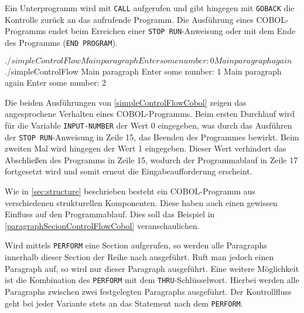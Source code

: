 Ein Unterprogramm wird mit \texttt{CALL} aufgerufen und gibt hingegen mit \texttt{GOBACK} die Kontrolle zurück an das aufrufende Programm. Die Ausführung eines COBOL-Programms endet beim Erreichen einer \texttt{STOP RUN}-Anweisung oder mit dem Ende des Programms (\texttt{END PROGRAM}). 

\sepCodeAndOutputCheck
\begin{shellwindow}
$ ./simpleControlFlow 
Main paragraph
Enter some number: 0
Main paragraph again
$ ./simpleControlFlow 
Main paragraph
Enter some number: 1 
Main paragraph again
Enter some number: 2
\end{shellwindow}

Die beiden Ausführungen von \autoref{simpleControlFlowCobol} zeigen das angesprochene Verhalten eines COBOL-Programms. Beim ersten Durchlauf wird für die Variable \texttt{INPUT-NUMBER} der Wert 0 eingegeben, was durch das Ausführen der \texttt{STOP RUN}-Anweisung in Zeile 15, das Beenden des Programmes bewirkt. Beim zweiten Mal wird hingegen der Wert 1 eingegeben. Dieser Wert verhindert das Abschließen des Programms in Zeile 15, wodurch der Programmablauf in Zeile 17 fortgesetzt wird und somit erneut die Eingabeaufforderung erscheint.

Wie in \autoref{sec:structure} beschrieben besteht ein COBOL-Programm aus verschiedenen strukturellen Komponenten. Diese haben auch einen gewissen Einfluss auf den Programmablauf. Dies soll das Beispiel in \autoref{paragraphSecionControlFlowCobol} veranschaulichen.

\sepCodeAndOutputCheck
{}

Wird mittels \texttt{PERFORM} eine Section aufgerufen, so werden alle Paragraphs innerhalb dieser Section der Reihe nach ausgeführt. Ruft man jedoch einen Paragraph auf, so wird nur dieser Paragraph ausgeführt. Eine weitere Möglichkeit ist die Kombination des \texttt{PERFORM} mit dem \texttt{THRU}-Schlüsselwort. Hierbei werden alle Paragraphs zwischen zwei festgelegten Paragraphs ausgeführt. Der Kontrollfluss geht bei jeder Variante stets an das Statement nach dem \texttt{PERFORM}.

